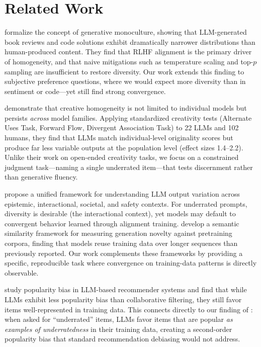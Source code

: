 \section{Related Work}
\label{sec:related}

\citet{wu2024generative} formalize the concept of generative monoculture, showing that LLM-generated book reviews and code solutions exhibit dramatically narrower distributions than human-produced content. They find that RLHF alignment is the primary driver of homogeneity, and that naive mitigations such as temperature scaling and top-$p$ sampling are insufficient to restore diversity. Our work extends this finding to subjective preference questions, where we would expect more diversity than in sentiment or code---yet still find strong convergence.

\citet{wenger2025creative} demonstrate that creative homogeneity is not limited to individual models but persists \emph{across} model families. Applying standardized creativity tests (Alternate Uses Task, Forward Flow, Divergent Association Task) to 22 LLMs and 102 humans, they find that LLMs match individual-level originality scores but produce far less variable outputs at the population level (effect sizes 1.4--2.2). Unlike their work on open-ended creativity tasks, we focus on a constrained judgment task---naming a single underrated item---that tests discernment rather than generative fluency.

\citet{dhingra2026magic} propose a unified framework for understanding LLM output variation across epistemic, interactional, societal, and safety contexts. For underrated prompts, diversity is desirable (the interactional context), yet models may default to convergent behavior learned through alignment training. \citet{davydov2025novelty} develop a semantic similarity framework for measuring generation novelty against pretraining corpora, finding that models reuse training data over longer sequences than previously reported. Our work complements these frameworks by providing a specific, reproducible task where convergence on training-data patterns is directly observable.

\citet{lichtenberg2024popularity} study popularity bias in LLM-based recommender systems and find that while LLMs exhibit less popularity bias than collaborative filtering, they still favor items well-represented in training data. This connects directly to our finding of \metapop: when asked for ``underrated'' items, LLMs favor items that are popular \emph{as examples of underratedness} in their training data, creating a second-order popularity bias that standard recommendation debiasing would not address.


